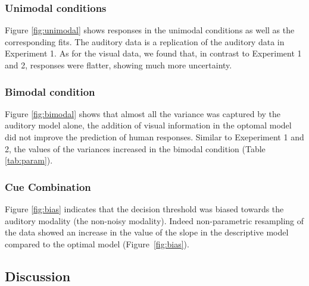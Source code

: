 \documentclass[english,,man,floatsintext]{apa6}
\theoremstyle{definition}
\theoremstyle{definition}
\theoremstyle{definition}
\theoremstyle{remark}
\begin{document}
\subsubsection{Unimodal conditions}\label{unimodal-conditions-2}

Figure \ref{fig:unimodal} shows responses in the unimodal conditions as
well as the corresponding fits. The auditory data is a replication of
the auditory data in Experiment 1. As for the visual data, we found
that, in contrast to Experiment 1 and 2, responses were flatter, showing
much more uncertainty.

\subsubsection{Bimodal condition}\label{bimodal-condition-3}

Figure \ref{fig:bimodal} shows that almost all the variance was captured
by the auditory model alone, the addition of visual information in the
optomal model did not improve the prediction of human responses. Similar
to Exeperiment 1 and 2, the values of the variances increased in the
bimodal condition (Table \ref{tab:param}).

\subsubsection{Cue Combination}\label{cue-combination-2}

Figure \ref{fig:bias} indicates that the decision threshold was biased
towards the auditory modality (the non-noisy modality). Indeed
non-parametric resampling of the data showed an increase in the value of
the slope in the descriptive model compared to the optimal model
(Figure~\ref{fig:bias}).

\subsection{Discussion}\label{discussion-2}
\end{document}
